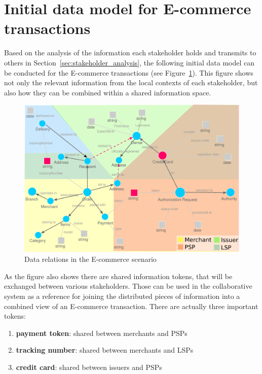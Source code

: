 
\section{Initial data model for \gls{E-commerce} transactions}
\label{sec:data_model_transactions}

Based on the analysis of the information each stakeholder holds and transmits to others in Section~\ref{sec:stakeholder_analysis}, the following initial data model can be conducted for the \gls{E-commerce} transactions (see Figure~\ref{fig:images_data_model}). This figure shows not only the relevant information from the local contexts of each stakeholder, but also how they can be combined within a shared information space. \\

\begin{figure}[!ht]
  \centering
  \includegraphics[width=0.9\columnwidth]{images/ontology_scenario_1.pdf}
  \caption[Data relations in the E-commerce scenario]{Data relations in the \gls{E-commerce} scenario}
\label{fig:images_data_model}
\end{figure}

As the figure also shows there are shared information tokens, that will be exchanged between various stakeholders. Those can be used in the collaborative system as a reference for joining the distributed pieces of information into a combined view of an \gls{E-commerce} transaction. There are actually three important tokens: \@

\begin{enumerate}
  \item \textbf{payment token}: shared between merchants and \gls{PSP}s
  \item \textbf{tracking number}: shared between merchants and \gls{LSP}s
  \item \textbf{credit card}: shared between issuers and \gls{PSP}s
\end{enumerate}

